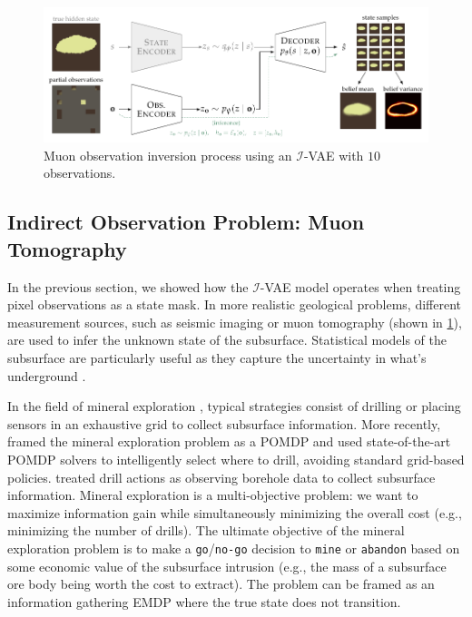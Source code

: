 \begin{figure}[t]
    \centering
    \includegraphics[width=\linewidth]{diagrams/ivae/muon-ivae-process.pdf}
    \caption{Muon observation inversion process using an $\mathcal{I}$-VAE with $10$ observations.}
    \label{fig:muon_ivae_process}
\end{figure}


\subsection{Indirect Observation Problem: Muon Tomography}
In the previous section, we showed how the $\mathcal{I}$-VAE model operates when treating pixel observations as a state mask.
In more realistic geological problems, different measurement sources, such as seismic imaging \cite{deng2022openfwi} or muon tomography \cite{schultz2007statistical,lechmann2021muon} (shown in \cref{fig:muon_ivae_process}), are used to infer the unknown state of the subsurface.
Statistical models of the subsurface are particularly useful as they capture the uncertainty in what's underground \cite{kaipio2006statistical}.

In the field of mineral exploration \cite{haldar2018mineral}, typical strategies consist of drilling or placing sensors in an exhaustive grid to collect subsurface information.
More recently, \textcite{mern2021improved} framed the mineral exploration problem as a POMDP and used state-of-the-art POMDP solvers to intelligently select where to drill, avoiding standard grid-based policies.
\textcite{mern2021improved} treated drill actions as observing borehole data to collect subsurface information.
Mineral exploration is a multi-objective problem: we want to maximize information gain while simultaneously minimizing the overall cost (e.g., minimizing the number of drills).
The ultimate objective of the mineral exploration problem is to make a \texttt{go}/\texttt{no-go} decision to \texttt{mine} or \texttt{abandon} based on some economic value of the subsurface intrusion (e.g., the mass of a subsurface ore body being worth the cost to extract).
The problem can be framed as an information gathering EMDP where the true state does not transition. 

